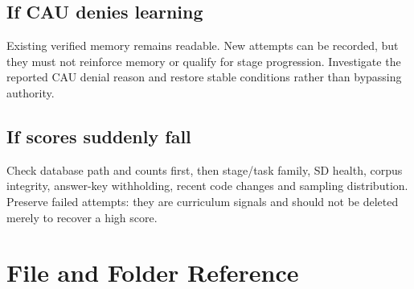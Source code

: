 \documentclass[11pt,a4paper]{article}
\begin{document}
\subsection{If CAU denies learning}

Existing verified memory remains readable. New attempts can be recorded, but they must not
reinforce memory or qualify for stage progression. Investigate the reported CAU denial reason
and restore stable conditions rather than bypassing authority.

\subsection{If scores suddenly fall}

Check database path and counts first, then stage/task family, SD health, corpus integrity,
answer-key withholding, recent code changes and sampling distribution. Preserve failed
attempts: they are curriculum signals and should not be deleted merely to recover a high score.

\section{File and Folder Reference}
\end{document}
